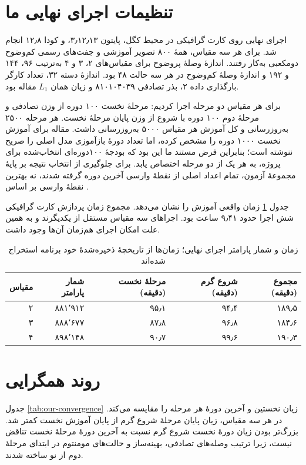 \section{تنظیمات اجرای نهایی ما}

اجرای نهایی روی کارت گرافیکی  در محیط کگل، پایتون ۳٫۱۲٫۱۳،  و کودا ۱۲٫۸ انجام شد. برای هر سه مقیاس، همهٔ ۸۰۰ تصویر آموزشی  و جفت‌های رسمی کم‌وضوح دو‌مکعبی به‌کار رفتند. اندازهٔ وصلهٔ پروضوح برای مقیاس‌های ۲، ۳ و ۴ به‌ترتیب ۹۶، ۱۴۴ و ۱۹۲ و اندازهٔ وصلهٔ کم‌وضوح در هر سه حالت ۴۸ بود. اندازهٔ دسته ۳۲، تعداد کارگر بارگذاری داده ۲، بذر تصادفی ۸۱۰۱۰۴۰۳۹ و زیان همان $L_1$ مقاله بود.

برای هر مقیاس دو مرحله اجرا کردیم: مرحلهٔ نخست ۱۰۰ دوره از وزن تصادفی و مرحلهٔ دوم ۱۰۰ دوره با شروع از وزن پایان مرحلهٔ نخست. هر مرحله ۲۵۰۰ به‌روزرسانی و کل آموزش هر مقیاس ۵۰۰۰ به‌روزرسانی داشت. مقاله برای آموزش نخست ۱۰۰۰ دوره را مشخص کرده، اما تعداد دورهٔ بازآموزی مدل اصلی را صریح ننوشته است؛ بنابراین فرض مستند ما این بود که بودجهٔ ۱۰۰‌دوره‌ای انتخاب‌شده برای پروژه، به هر یک از دو مرحله اختصاص یابد. برای جلوگیری از انتخاب نتیجه بر پایهٔ مجموعهٔ آزمون، تمام اعداد اصلی از نقطهٔ وارسی آخرین دوره گرفته شدند، نه بهترین نقطهٔ وارسی بر اساس .

جدول \ref{tab:our-training-time} زمان واقعی آموزش را نشان می‌دهد. مجموع زمان پردازش کارت گرافیکی شش اجرا حدود ۹٫۴۱ ساعت بود. اجراهای سه مقیاس مستقل از یکدیگرند و به همین علت امکان اجرای هم‌زمان آن‌ها وجود داشت.

\begin{table}[H]
\centering
\caption{زمان و شمار پارامتر اجرای نهایی؛ زمان‌ها از تاریخچهٔ ذخیره‌شدهٔ خود برنامه استخراج شده‌اند}
\label{tab:our-training-time}
\begin{tabular}{rrrrr}
\toprule
مقیاس & شمار پارامتر & مرحلهٔ نخست (دقیقه) & شروع گرم (دقیقه) & مجموع (دقیقه) \\
\midrule
۲ & ۸۸۱٬۹۱۲ & ۹۵٫۱ & ۹۴٫۴ & ۱۸۹٫۵ \\
۳ & ۸۸۸٬۶۷۷ & ۸۷٫۸ & ۹۶٫۸ & ۱۸۴٫۶ \\
۴ & ۸۹۸٬۱۴۸ & ۹۰٫۷ & ۹۹٫۶ & ۱۹۰٫۳ \\
\bottomrule
\end{tabular}
\end{table}

\section{روند همگرایی}

جدول \ref{tab:our-convergence} زیان نخستین و آخرین دورهٔ هر مرحله را مقایسه می‌کند. در هر سه مقیاس، زیان پایان مرحلهٔ شروع گرم از پایان آموزش نخست کمتر شد. بزرگ‌تر بودن زیان دورهٔ نخست شروع گرم نسبت به آخرین دورهٔ مرحلهٔ نخست تناقض نیست، زیرا ترتیب وصله‌های تصادفی، بهینه‌ساز و حالت‌های مومنتوم در ابتدای مرحلهٔ دوم از نو ساخته شدند.

